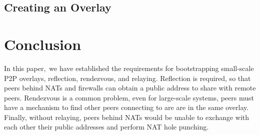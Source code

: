 \documentclass[conference]{IEEEtran}
\begin{document}

\subsection{Creating an Overlay}



\section{Conclusion}
\label{conclusions}

In this paper, we have established the requirements for bootstrapping small-scale
P2P overlays, reflection, rendezvous, and relaying.  Reflection is required, so
that peers behind NATs and firewalls can obtain a public address to share with
remote peers.  Rendezvous is a common problem, even for large-scale systems,
peers must have a mechanism to find other peers connecting to are are in the
same overlay.  Finally, without relaying, peers behind NATs would be unable to
exchange with each other their public addresses and perform NAT hole punching.
\end{document}
